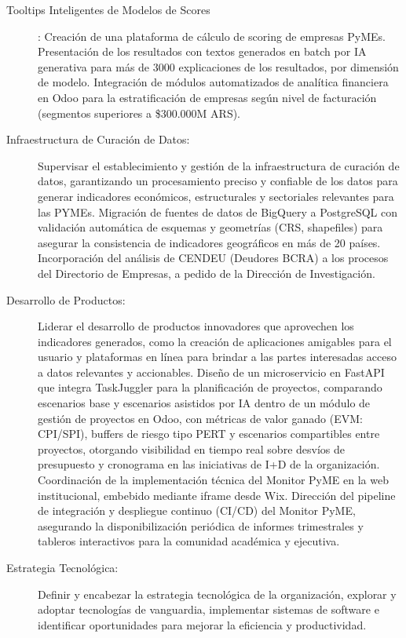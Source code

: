 {\begin{description}
		\item[Tooltips Inteligentes de Modelos de Scores]: Creación de una plataforma de cálculo de scoring de empresas PyMEs. Presentación de los resultados con textos generados en batch por IA generativa para más de 3000 explicaciones de los resultados, por dimensión de modelo. Integración de módulos automatizados de analítica financiera en Odoo para la estratificación de empresas según nivel de facturación (segmentos superiores a \$300.000M ARS).
		\item[Infraestructura de Curación de Datos:] Supervisar el establecimiento y gestión de la infraestructura de curación de datos, garantizando un procesamiento preciso y confiable de los datos para generar indicadores económicos, estructurales y sectoriales relevantes para las PYMEs. Migración de fuentes de datos de BigQuery a PostgreSQL con validación automática de esquemas y geometrías (CRS, shapefiles) para asegurar la consistencia de indicadores geográficos en más de 20 países. Incorporación del análisis de CENDEU (Deudores BCRA) a los procesos del Directorio de Empresas, a pedido de la Dirección de Investigación.
		\item[Desarrollo de Productos:] Liderar el desarrollo de productos innovadores que aprovechen los indicadores generados, como la creación de aplicaciones amigables para el usuario y plataformas en línea para brindar a las partes interesadas acceso a datos relevantes y accionables. Diseño de un microservicio en FastAPI que integra TaskJuggler para la planificación de proyectos, comparando escenarios base y escenarios asistidos por IA dentro de un módulo de gestión de proyectos en Odoo, con métricas de valor ganado (EVM: CPI/SPI), buffers de riesgo tipo PERT y escenarios compartibles entre proyectos, otorgando visibilidad en tiempo real sobre desvíos de presupuesto y cronograma en las iniciativas de I+D de la organización. Coordinación de la implementación técnica del Monitor PyME en la web institucional, embebido mediante iframe desde Wix. Dirección del pipeline de integración y despliegue continuo (CI/CD) del Monitor PyME, asegurando la disponibilización periódica de informes trimestrales y tableros interactivos para la comunidad académica y ejecutiva.
		\item[Estrategia Tecnológica:] Definir y encabezar la estrategia tecnológica de la organización, explorar y adoptar tecnologías de vanguardia, implementar sistemas de software e identificar oportunidades para mejorar la eficiencia y productividad.

\end{description}}
